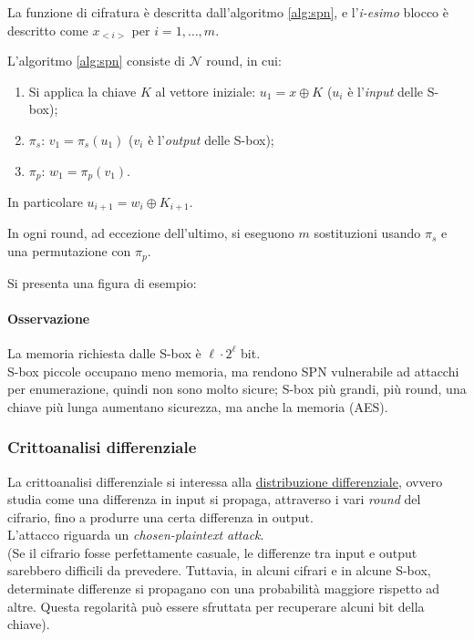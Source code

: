     \noindent La funzione di cifratura è descritta dall'algoritmo \ref{alg:spn}, e l'\textit{i-esimo} blocco è descritto come $x_{<i>}$ per $i = 1,\dots,m$.

 
\noindent L'algoritmo \ref{alg:spn} consiste di $\mathcal{N}$ round, in cui:
\begin{enumerate}
    \item Si applica la chiave $K$ al vettore iniziale: $u_1=x \oplus K$ ($u_i$ è l'\emph{input} delle S-box);
    \item $\pi_s$: $v_1=\pi_s(u_1)$ ($v_i$ è l'\emph{output} delle S-box);
    \item $\pi_p$: $w_1=\pi_p(v_1)$. 
\end{enumerate} 

In particolare  $u_{i+1} = w_i \oplus K_{i+1}$. 

In ogni round, ad eccezione dell'ultimo, si eseguono $m$ sostituzioni usando $\pi_s$ e una permutazione con $\pi_p$. 

\newpage Si presenta una figura di esempio:


\vspace{1em}
\paragraph{Osservazione} La memoria richiesta dalle S-box è $\ell \cdot 2^{\ell}$ bit. \\ S-box piccole occupano meno memoria, ma rendono SPN vulnerabile ad attacchi per enumerazione, quindi non sono molto sicure; S-box più grandi, più round, una chiave più lunga aumentano sicurezza, ma anche la memoria (AES). 

\subsubsection{Crittoanalisi differenziale}
La crittoanalisi differenziale si interessa alla \underline{distribuzione differenziale}, ovvero studia come una differenza in input si propaga, attraverso i vari \textit{round} del cifrario, fino a produrre una certa differenza in output.  \\ L'attacco riguarda un \textit{chosen-plaintext attack}.\\ (Se il cifrario fosse perfettamente casuale, le differenze tra input e output sarebbero difficili da prevedere. Tuttavia, in alcuni cifrari e in alcune S-box, determinate differenze si propagano con una probabilità maggiore rispetto ad altre. Questa regolarità può essere sfruttata per recuperare alcuni bit della chiave).

